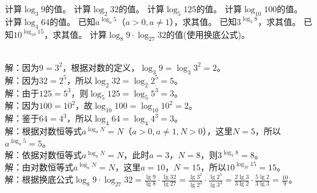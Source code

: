 \begin{Exercise}[title={对数运算基础练习}, label={ex:basic_logarithm} ,difficulty = 1]
    \Question 计算\(\log_3 9\)的值。
    \Question 计算\(\log_2 32\)的值。
    \Question 计算\(\log_5 125\)的值。
    \Question 计算\(\log_{10}100\)的值。
    \Question 计算\(\log_4 64\)的值。
    \Question 已知\(a^{\log_a 5}\)（\(a>0,a\neq1\)），求其值。
    \Question 已知\(3^{\log_3 8}\)，求其值。
    \Question 已知\(10^{\log_{10}15}\)，求其值。
    \Question 计算\(\log_8 9\cdot\log_{27}32\)的值(使用换底公式)。
\end{Exercise}
\begin{MyAnswer}[ref={ex:basic_logarithm}]
    \Question {}\\解：因为\(9 = 3^2\)，根据对数的定义，\(\log_3 9=\log_3 3^2 = 2\)。
    \Question {}\\解：因为\(32 = 2^5\)，所以\(\log_2 32=\log_2 2^5 = 5\)。
    \Question {}\\解：由于\(125 = 5^3\)，则\(\log_5 125=\log_5 5^3 = 3\)。
    \Question {}\\解：因为\(100 = 10^2\)，故\(\log_{10}100=\log_{10}10^2 = 2\)。
    \Question {}\\解：鉴于\(64 = 4^3\)，所以\(\log_4 64=\log_4 4^3 = 3\)。
    \Question {}\\解：根据对数恒等式\(a^{\log_a N}=N\)（\(a>0,a\neq1,N>0\)），这里\(N = 5\)，所以\(a^{\log_a 5}=5\)。
    \Question {}\\解：依据对数恒等式\(a^{\log_a N}=N\)，此时\(a = 3\)，\(N = 8\)，则\(3^{\log_3 8}=8\)。
    \Question {}\\解：由对数恒等式\(a^{\log_a N}=N\)，这里\(a = 10\)，\(N = 15\)，所以\(10^{\log_{10}15}=15\)。
    \Question {}\\解：根据换底公式\(\log_8 9\cdot\log_{27}32=\frac{\lg 9}{\lg 8}\cdot\frac{\lg 32}{\lg 27}=\frac{\lg 3^2}{\lg 2^3}\cdot\frac{\lg 2^5}{\lg 3^3}=\frac{2\lg 3}{3\lg 2}\cdot\frac{5\lg 2}{3\lg 3}=\frac{10}{9}\)。
\end{MyAnswer}



